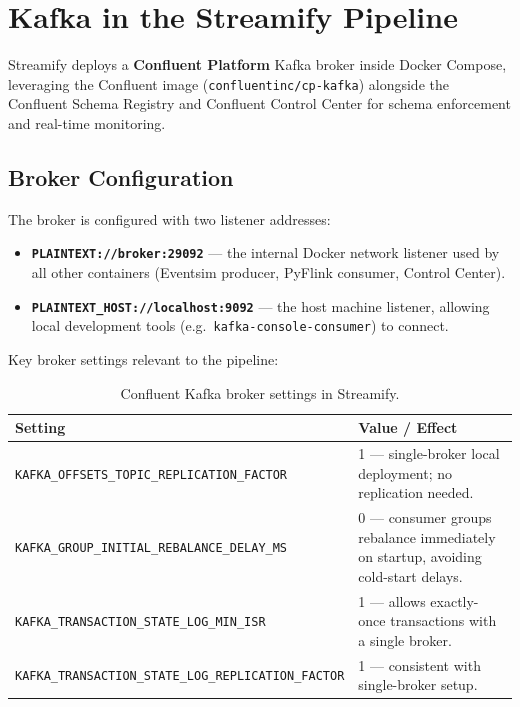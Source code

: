 \section{Kafka in the Streamify Pipeline}

Streamify deploys a \textbf{Confluent Platform} Kafka broker inside Docker Compose,
leveraging the Confluent image (\texttt{confluentinc/cp-kafka}) alongside the Confluent
Schema Registry and Confluent Control Center for schema enforcement and real-time monitoring.

\subsection{Broker Configuration}

The broker is configured with two listener addresses:

\begin{itemize}
  \item \textbf{\texttt{PLAINTEXT://broker:29092}} — the internal Docker network listener
        used by all other containers (Eventsim producer, PyFlink consumer, Control Center).
  \item \textbf{\texttt{PLAINTEXT\_HOST://localhost:9092}} — the host machine listener,
        allowing local development tools (e.g.\ \texttt{kafka-console-consumer}) to connect.
\end{itemize}

Key broker settings relevant to the pipeline:

\begin{table}[H]
  \centering
  \caption{Confluent Kafka broker settings in Streamify.}
  \label{tab:kafka-config}
  \begin{tabularx}{\textwidth}{lX}
    \toprule
    \textbf{Setting}                         & \textbf{Value / Effect} \\
    \midrule
    \texttt{KAFKA\_OFFSETS\_TOPIC\_REPLICATION\_FACTOR} & 1 — single-broker local deployment; no replication needed. \\
    \texttt{KAFKA\_GROUP\_INITIAL\_REBALANCE\_DELAY\_MS} & 0 — consumer groups rebalance immediately on startup, avoiding cold-start delays. \\
    \texttt{KAFKA\_TRANSACTION\_STATE\_LOG\_MIN\_ISR}    & 1 — allows exactly-once transactions with a single broker. \\
    \texttt{KAFKA\_TRANSACTION\_STATE\_LOG\_REPLICATION\_FACTOR} & 1 — consistent with single-broker setup. \\
    \bottomrule
  \end{tabularx}
\end{table}

